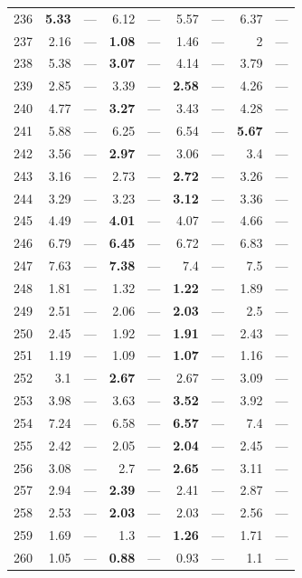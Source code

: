 \begin{longtable}{lr@{\hskip 4pt}l@{\hskip 12pt}r@{\hskip 4pt}l@{\hskip 12pt}r@{\hskip 4pt}l@{\hskip 12pt}r@{\hskip 4pt}l@{\hskip 12pt}}
236 & \textbf{5.33} & --- & 6.12 & --- & 5.57 & --- & 6.37 & --- \\
237 & 2.16 & --- & \textbf{1.08} & --- & 1.46 & --- & 2 & --- \\
238 & 5.38 & --- & \textbf{3.07} & --- & 4.14 & --- & 3.79 & --- \\
239 & 2.85 & --- & 3.39 & --- & \textbf{2.58} & --- & 4.26 & --- \\
240 & 4.77 & --- & \textbf{3.27} & --- & 3.43 & --- & 4.28 & --- \\
241 & 5.88 & --- & 6.25 & --- & 6.54 & --- & \textbf{5.67} & --- \\
242 & 3.56 & --- & \textbf{2.97} & --- & 3.06 & --- & 3.4 & --- \\
243 & 3.16 & --- & 2.73 & --- & \textbf{2.72} & --- & 3.26 & --- \\
244 & 3.29 & --- & 3.23 & --- & \textbf{3.12} & --- & 3.36 & --- \\
245 & 4.49 & --- & \textbf{4.01} & --- & 4.07 & --- & 4.66 & --- \\
246 & 6.79 & --- & \textbf{6.45} & --- & 6.72 & --- & 6.83 & --- \\
247 & 7.63 & --- & \textbf{7.38} & --- & 7.4 & --- & 7.5 & --- \\
248 & 1.81 & --- & 1.32 & --- & \textbf{1.22} & --- & 1.89 & --- \\
249 & 2.51 & --- & 2.06 & --- & \textbf{2.03} & --- & 2.5 & --- \\
250 & 2.45 & --- & 1.92 & --- & \textbf{1.91} & --- & 2.43 & --- \\
251 & 1.19 & --- & 1.09 & --- & \textbf{1.07} & --- & 1.16 & --- \\
252 & 3.1 & --- & \textbf{2.67} & --- & 2.67 & --- & 3.09 & --- \\
253 & 3.98 & --- & 3.63 & --- & \textbf{3.52} & --- & 3.92 & --- \\
254 & 7.24 & --- & 6.58 & --- & \textbf{6.57} & --- & 7.4 & --- \\
255 & 2.42 & --- & 2.05 & --- & \textbf{2.04} & --- & 2.45 & --- \\
256 & 3.08 & --- & 2.7 & --- & \textbf{2.65} & --- & 3.11 & --- \\
257 & 2.94 & --- & \textbf{2.39} & --- & 2.41 & --- & 2.87 & --- \\
258 & 2.53 & --- & \textbf{2.03} & --- & 2.03 & --- & 2.56 & --- \\
259 & 1.69 & --- & 1.3 & --- & \textbf{1.26} & --- & 1.71 & --- \\
260 & 1.05 & --- & \textbf{0.88} & --- & 0.93 & --- & 1.1 & --- \\

\end{longtable}
